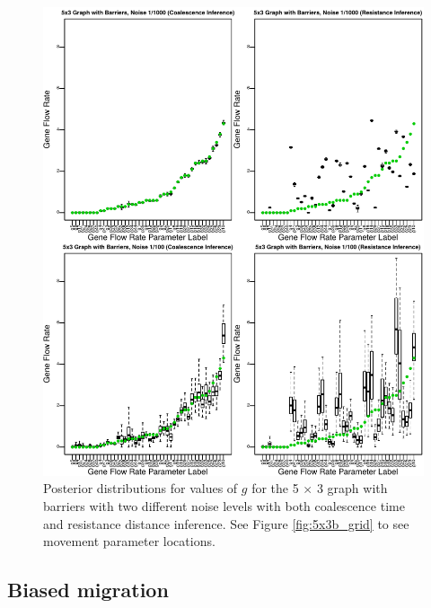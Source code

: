 \documentclass{article}
\newcommand{\plr}[1]{{\em \color{blue} #1}}
\begin{document}
\begin{figure}
\centering
     \includegraphics[scale=1]{figs/5x3b_post_coalvcom}
    \caption{Posterior distributions for values of $g$ 
    for the 5 $\times$ 3 graph with barriers 
    with two different noise levels with both coalescence time and resistance distance inference.
    See Figure \ref{fig:5x3b_grid} to see movement parameter locations.
}
    \label{fig:5x3b_post_coalvcom}
\end{figure}


\subsection*{Biased migration}
\label{sec:biased_migration}
\end{document}
